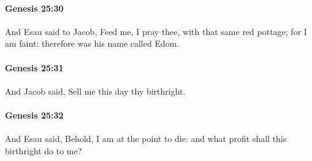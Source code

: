 		\paragraph{Genesis 25:30} %
			\label{GENESIS-25-30}

			And Esau said to Jacob, Feed me, I pray thee, with that same red pottage; for I am faint: therefore was his name called Edom.


		\paragraph{Genesis 25:31} %
			\label{GENESIS-25-31}

			And Jacob said, Sell me this day thy birthright.


		\paragraph{Genesis 25:32} %
			\label{GENESIS-25-32}

			And Esau said, Behold, I am at the point to die: and what profit shall this birthright do to me?


